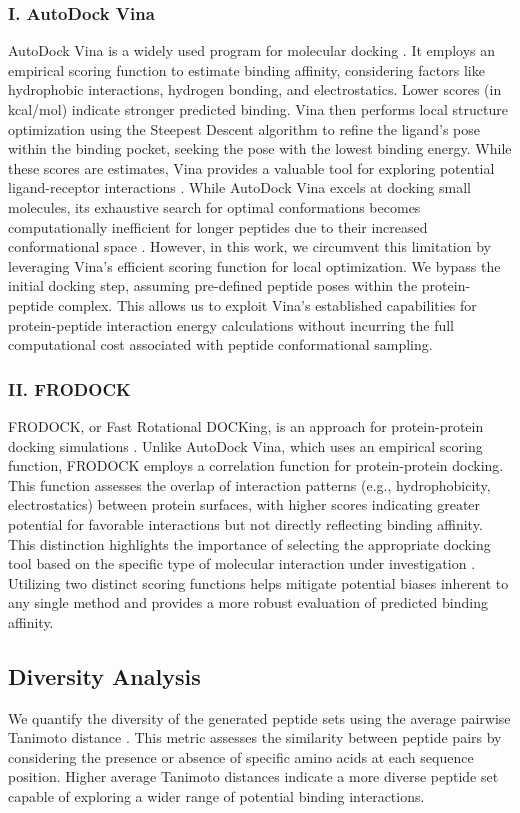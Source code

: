 \subsubsection*{I. AutoDock Vina}
AutoDock Vina is a widely used program for molecular docking \cite{trott2010autodock}. It employs an empirical scoring function to estimate binding affinity, considering factors like hydrophobic interactions, hydrogen bonding, and electrostatics. Lower scores (in kcal/mol) indicate stronger predicted binding. Vina then performs local structure optimization using the Steepest Descent algorithm to refine the ligand's pose within the binding pocket, seeking the pose with the lowest binding energy. While these scores are estimates, Vina provides a valuable tool for exploring potential ligand-receptor interactions \cite{trott2010autodock}. While AutoDock Vina excels at docking small molecules, its exhaustive search for optimal conformations becomes computationally inefficient for longer peptides due to their increased conformational space \cite{rentzsch2015docking}. However, in this work, we circumvent this limitation by leveraging Vina's efficient scoring function for local optimization. We bypass the initial docking step, assuming pre-defined peptide poses within the protein-peptide complex. This allows us to exploit Vina's established capabilities for protein-peptide interaction energy calculations without incurring the full computational cost associated with peptide conformational sampling.

\subsubsection*{II. FRODOCK}
FRODOCK, or Fast Rotational DOCKing, is an approach for protein-protein docking simulations \cite{Aportela2016}. Unlike AutoDock Vina, which uses an empirical scoring function, FRODOCK employs a correlation function for protein-protein docking. This function assesses the overlap of interaction patterns (e.g., hydrophobicity, electrostatics) between protein surfaces, with higher scores indicating greater potential for favorable interactions but not directly reflecting binding affinity. This distinction highlights the importance of selecting the appropriate docking tool based on the specific type of molecular interaction under investigation \cite{Aportela2016}.  \\

Utilizing two distinct scoring functions helps mitigate potential biases inherent to any single method and provides a more robust evaluation of predicted binding affinity. 

\subsection{Diversity Analysis}
We quantify the diversity of the generated peptide sets using the average pairwise Tanimoto distance \cite{bajusz2015sim, tanimoto1958elementary}. This metric assesses the similarity between peptide pairs by considering the presence or absence of specific amino acids at each sequence position. Higher average Tanimoto distances indicate a more diverse peptide set capable of exploring a wider range of potential binding interactions.
